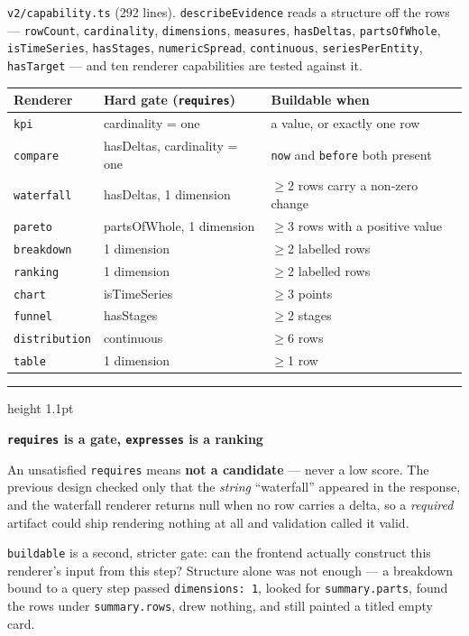 \documentclass[11pt,a4paper]{report}
\newcommand{\file}[1]{\texttt{\small #1}}
\newcommand{\code}[1]{\texttt{\small #1}}
\newenvironment{keybox}[1]
 {\par\medskip\begin{center}\begin{minipage}{0.94\textwidth}%
  {\color{navy}\hrule height 1.1pt}\vspace{5pt}\par
  \textbf{\color{navy}#1}\par\vspace{3pt}\small}
 {\par\vspace{5pt}{\color{mist}\hrule height 0.8pt}\end{minipage}\end{center}\medskip}
\begin{document}
\file{v2/capability.ts} (292 lines). \code{describeEvidence} reads a structure off the rows
--- \code{rowCount}, \code{cardinality}, \code{dimensions}, \code{measures}, \code{hasDeltas},
\code{partsOfWhole}, \code{isTimeSeries}, \code{hasStages}, \code{numericSpread},
\code{continuous}, \code{seriesPerEntity}, \code{hasTarget} --- and ten renderer capabilities are
tested against it.

\begin{center}
\small
\begin{tabular}{@{}lp{4.4cm}p{6.2cm}@{}}
\toprule
\textbf{Renderer} & \textbf{Hard gate (\code{requires})} & \textbf{Buildable when}\\
\midrule
\code{kpi} & cardinality = one & a value, or exactly one row\\
\code{compare} & hasDeltas, cardinality = one & \code{now} and \code{before} both present\\
\code{waterfall} & hasDeltas, 1 dimension & $\geq$2 rows carry a non-zero change\\
\code{pareto} & partsOfWhole, 1 dimension & $\geq$3 rows with a positive value\\
\code{breakdown} & 1 dimension & $\geq$2 labelled rows\\
\code{ranking} & 1 dimension & $\geq$2 labelled rows\\
\code{chart} & isTimeSeries & $\geq$3 points\\
\code{funnel} & hasStages & $\geq$2 stages\\
\code{distribution} & continuous & $\geq$6 rows\\
\code{table} & 1 dimension & $\geq$1 row\\
\bottomrule
\end{tabular}
\end{center}

\begin{keybox}{\code{requires} is a gate, \code{expresses} is a ranking}
An unsatisfied \code{requires} means \textbf{not a candidate} --- never a low score. The previous
design checked only that the \emph{string} ``waterfall'' appeared in the response, and the waterfall
renderer returns null when no row carries a delta, so a \emph{required} artifact could ship
rendering nothing at all and validation called it valid.

\code{buildable} is a second, stricter gate: can the frontend actually construct this renderer's
input from this step? Structure alone was not enough --- a breakdown bound to a query step passed
\code{dimensions: 1}, looked for \code{summary.parts}, found the rows under \code{summary.rows},
drew nothing, and still painted a titled empty card.
\end{keybox}
\end{document}
